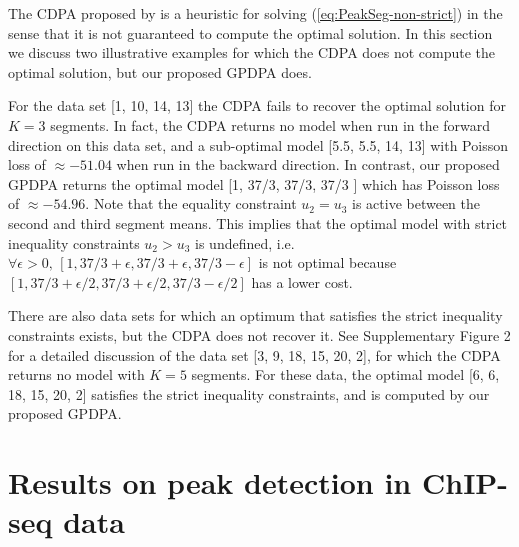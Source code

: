 \documentclass[aoas]{imsart}
\begin{document}
The CDPA proposed by \citep{HOCKING-PeakSeg} is a heuristic for
solving (\ref{eq:PeakSeg-non-strict}) in the sense that it is not
guaranteed to compute the optimal solution. In this section we discuss
two illustrative examples for which the CDPA does not compute the optimal
solution, but our proposed GPDPA does.

For the data set [1, 10, 14, 13] the CDPA fails to recover
the optimal solution for $K=3$ segments. In fact, the CDPA returns no
model when run in the forward direction on this data set, and a
sub-optimal model [5.5, 5.5, 14, 13] with Poisson loss of
$\approx -51.04$ when run in the backward direction. In contrast, our
proposed GPDPA returns the optimal model [1, 37/3, 37/3, 37/3 ] which
has Poisson loss of $\approx -54.96$. Note that the equality
constraint $u_2=u_3$ is active between the second and third segment
means. This implies that the optimal model with strict inequality
constraints $u_2>u_3$ is undefined, i.e. $\forall \epsilon>0,\, [1, 37/3
+ \epsilon, 37/3 + \epsilon, 37/3 - \epsilon]$ is not optimal because
$[1, 37/3 + \epsilon/2, 37/3 +\epsilon/2, 37/3 - \epsilon/2]$ has a
lower cost.

There are also data sets for which an optimum that satisfies the
strict inequality constraints exists, but the CDPA does not recover
it. See Supplementary Figure 2 for a detailed discussion of the data
set [3, 9, 18, 15, 20, 2], for which the CDPA returns no model with
$K=5$ segments. For these data, the optimal model [6, 6, 18, 15, 20,
2] satisfies the strict inequality constraints, and is computed by our
proposed GPDPA.

\section{Results on peak detection in ChIP-seq data}
\label{sec:results-chip-seq}
\label{sec:results}

\end{document}
